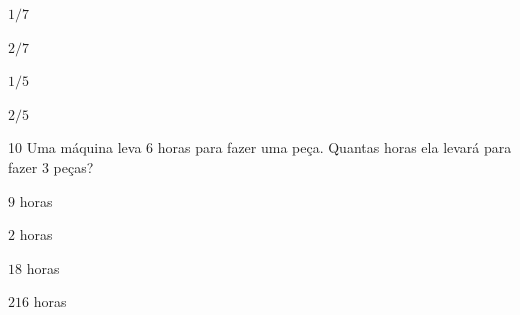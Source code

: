 \begin{escolha}
\item
  $1/7$
\item
  $2/7$
\item
  $1/5$
\item
  $2/5$
\end{escolha}




\num{10} Uma máquina leva $6$ horas para fazer uma peça. Quantas horas ela
levará para fazer $3$ peças?

\begin{escolha}
\item $9$ horas
\item $2$ horas
\item $18$ horas
\item $216$ horas
\end{escolha}



